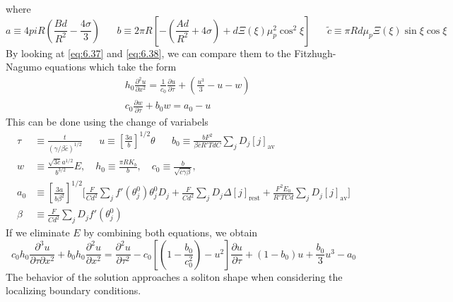 \documentclass{article}
\newcommand{\pd}[2]{\frac{\partial #1}{\partial #2}}
\newcommand{\pdt}[2]{\frac{\partial ^2 #1}{\partial #2 ^2}}
\newcommand{\twen}{\hspace{20pt}}
\numberwithin{equation}{section}
\begin{document}
where 
\begin{equation*}
    a \equiv 4pi R\left( \frac{Bd}{R^2} - \frac{4\sigma}{3}\right) \twen b\equiv 2\pi R \left[ -\left( \frac{Ad}{R^2} + 4\sigma\right) + d\Xi(\xi)\mu_p^2\cos^2\xi \right] \twen \tilde{c} \equiv \pi R d\mu_p\Xi(\xi)\sin\xi\cos\xi 
\end{equation*}
By looking at \eqref{eq:6.37} and \eqref{eq:6.38}, we can compare them to the Fitzhugh-Nagumo equations which take the form 
\begin{equation}
\begin{split}
    &h_0 \pdt{u}{x} = \frac{1}{c_0}\pd{u}{\tau} + \left( \frac{u^3}{3}-u-w\right)\\
    &c_0 \pd{w}{\tau} +b_0w = a_0-u
\end{split}
\end{equation}
This can be done using the change of variabels 
\begin{equation}
    \begin{split}
        \tau &\equiv \frac{t}{(\gamma / \beta\bar{c})^{1/2}} \twen u \equiv \left[ \frac{3a}{b} \right]^{1/2} \theta \twen 
b_0 \equiv \frac{bF^2}{\beta\bar{c}R'TdC} \sum_j D_j[j]_{\text{av}}  \\
w &\equiv \frac{\sqrt{3\bar{c}}a^{1/2}}{b^{3/2}}E, \quad h_0 \equiv \frac{\pi R K_b}{b} , \quad c_0 \equiv \frac{b}{\sqrt{\bar{c}\gamma\beta}} , \\
a_0 &\equiv \left[ \frac{3a}{b\beta^2} \right]^{1/2} \Bigg[ \frac{F}{Cd^2} \sum_j f'(\theta_j^0)\theta_j^0 D_j 
 + \frac{F}{Cd^2} \sum_j D_j \Delta[j]_{\text{rest}} 
 + \frac{F^2 E_0}{R'TCd} \sum_j D_j[j]_{\text{av}} \Bigg] \\
 \beta &\equiv \frac{F}{Cd^2}\sum_j D_j f'(\theta^0_j)
    \end{split}
\end{equation}
If we eliminate $E$ by combining both equations, we obtain 
\begin{equation}
    c_0h_0 \frac{\partial^3 u}{\partial \tau \partial x^2} + b_0h_0\pdt{u}{x} = \pdt{u}{\tau}-c_0\left[ \left( 1- \frac{b_0}{c_0^2} \right)-u^2 \right]\pd{u}{\tau} + (1-b_0)u + \frac{b_0}{3}u^3-a_0
\end{equation}
The behavior of the solution approaches a soliton shape when considering the localizing boundary conditions. 
\end{document}
